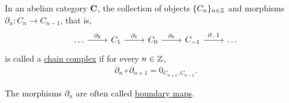 \begin{definition}\label{def:chain_complex}\cite{nLab:chain_complex}
  In an abelian category $\operatorname{\mathbf{C}}$, the collection of objects $\{ C_n \}_{n \in \mathbb Z}$ and morphisms $\partial_n: C_n \to C_{n-1}$, that is,
  \begin{equation}\label{def:chain_complex/diagram}
    \begin{tikzcd}[baseline=(current bounding box.center)]
      \ldots \arrow[r, "\partial_2"] & C_1 \arrow[r, "\partial_1"] & C_0 \arrow[r, "\partial_0"] & C_{-1} \arrow[r, "\partial_-1"] & \ldots
    \end{tikzcd}
  \end{equation}
  is called a \uline{chain complex} if for every $n \in \mathbb Z$,
  \begin{align*}
    \partial_n \circ \partial_{n+1} = 0_{C_{n+1},C_{n-1}}.
  \end{align*}

  The morphisms $\partial_n$ are often called \uline{boundary maps}.
\end{definition}
